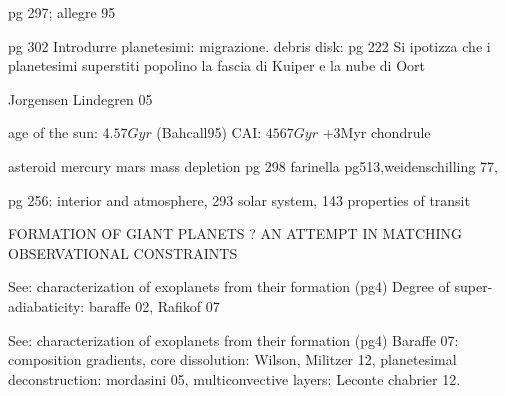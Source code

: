 \begin{workout}
pg 297; allegre 95
\end{workout}

\begin{workout}
pg 302
Introdurre planetesimi: migrazione.
debris disk: pg 222
Si ipotizza che i planetesimi superstiti popolino la fascia di Kuiper e la nube di Oort

\end{workout}

\begin{workout}
Jorgensen Lindegren 05
\end{workout}

\begin{workout}
age of the sun: $4.57Gyr$ (Bahcall95)
CAI: $4567Gyr$ +3Myr chondrule
\end{workout}

\begin{workout}
asteroid mercury mars mass depletion pg 298
farinella pg513,weidenschilling 77,

\end{workout}

\begin{workout}
pg 256: interior and atmosphere, 293 solar system, 143 properties of transit
\end{workout}


\begin{workout}
FORMATION OF GIANT PLANETS ? AN ATTEMPT IN MATCHING OBSERVATIONAL CONSTRAINTS
\end{workout}

\begin{workout}
See: characterization of exoplanets from their formation (pg4)
Degree of super-adiabaticity: baraffe 02, Rafikof 07
\end{workout}

\begin{workout}
See: characterization of exoplanets from their formation (pg4)
Baraffe 07: composition gradients, core dissolution: Wilson, Militzer 12, planetesimal deconstruction: mordasini 05, multiconvective layers: Leconte chabrier 12.
\end{workout}

